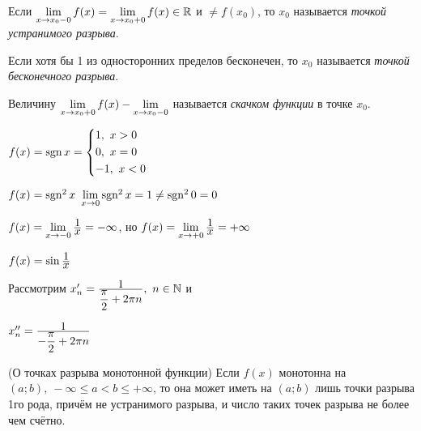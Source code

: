 \begin{definition}
	Если $\lim\limits_{x \to x_0-0} f(x) = \lim\limits_{x \to x_0+0} f(x) \in \mathbb{R}$ и $\neq f(x_0)$, то $x_0$ называется \textit{точкой устранимого разрыва}.
\end{definition}

\begin{definition}
	Если хотя бы 1 из односторонних пределов бесконечен, то $x_0$ называется \textit{точкой бесконечного разрыва}.
\end{definition}

\begin{definition}
	Величину $\lim\limits_{x \to x_0+0} f(x) - \lim\limits_{x \to x_0-0}$ называется \textit{скачком функции} в точке $x_0$.
\end{definition}

\begin{example}
	$f(x) = \operatorname{sgn} x = \left\{\begin{aligned}&{1,\ x > 0} \\ &{0,\ x = 0} \\ &{-1,\ x < 0}\end{aligned}\right.$
\end{example}

\begin{example}
	$f(x) = \operatorname{sgn}^2 x\ \lim\limits_{x \to 0} \operatorname{sgn}^2 x = 1 \neq \operatorname{sgn}^2 0 = 0$
\end{example}

\begin{example}
	$f(x) = \lim\limits_{x \to -0} \frac{\displaystyle 1}{\displaystyle x} = -\infty$, но $f(x) = \lim\limits_{x \to +0} \frac{\displaystyle 1}{\displaystyle x} = +\infty$
\end{example}

\begin{example}
	$f(x) = \sin \frac{\displaystyle 1}{\displaystyle x}$
	
	Рассмотрим $x'_n = \frac{\displaystyle 1}{\displaystyle \frac{\pi}{2} + 2\pi n},\ n \in \mathbb{N}$ и
	
	$x''_n = \frac{\displaystyle 1}{\displaystyle -\frac{\pi}{2} + 2\pi n}$
	
\end{example}

\begin{theorem} (О точках разрыва монотонной функции)
	Если $f(x)$ монотонна на $(a; b),\ -\infty \le a < b \le +\infty$, то она может иметь на $(a; b)$ лишь точки разрыва 1го рода, причём не устранимого разрыва, и число таких точек разрыва не более чем счётно.
\end{theorem}

